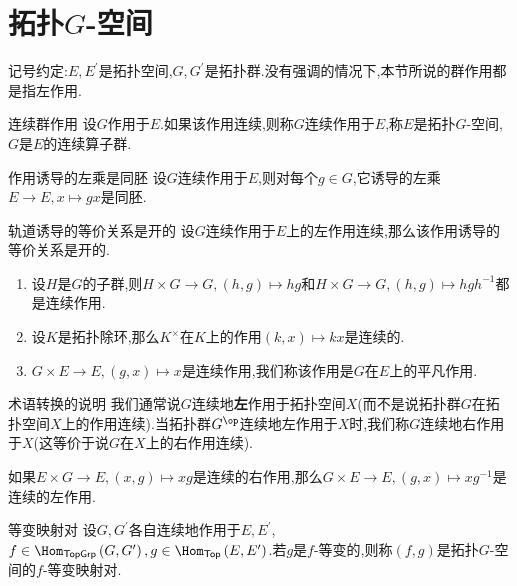 \section{拓扑\texorpdfstring{$G$}{G}-空间}

记号约定:$E,E^{\prime}$是拓扑空间,$G,G^{\prime}$是拓扑群.没有强调的情况下,本节所说的群作用都是指左作用.

\begin{definition}{连续群作用}{}
	设$G$作用于$E$.如果该作用连续,则称$G$连续作用于$E$,称$E$是拓扑$G$-空间,$G$是$E$的连续算子群.
\end{definition}

\begin{lemma}{作用诱导的左乘是同胚}{}
	设$G$连续作用于$E$,则对每个$g\in G$,它诱导的左乘$E\to E,x\mapsto gx$是同胚.
\end{lemma}

\begin{lemma}{轨道诱导的等价关系是开的}{}
	设$G$连续作用于$E$上的左作用连续,那么该作用诱导的等价关系是开的.
\end{lemma}

\begin{example}{}{}
	\begin{enumerate}
		\item 设$H$是$G$的子群,则$H\times G\to G,\left(h,g\right)\mapsto hg$和$H\times G\to G,\left(h,g\right)\mapsto hgh^{-1}$都是连续作用.
		\item 设$K$是拓扑除环,那么$K^{\times}$在$K$上的作用$\left(k,x\right)\mapsto kx$是连续的.
		\item $G\times E\to E,\left(g,x\right)\mapsto x$是连续作用,我们称该作用是$G$在$E$上的平凡作用.
	\end{enumerate}
\end{example}

\begin{remark}{术语转换的说明}{}
	我们通常说$G$连续地\textbf{左}作用于拓扑空间$X$(而不是说拓扑群$G$在拓扑空间$X$上的作用连续).当拓扑群$G^{\op}$连续地左作用于$X$时,我们称$G$连续地右作用于$X$(这等价于说$G$在$X$上的右作用连续).
	
	如果$E\times G\to E,\left(x,g\right)\mapsto xg$是连续的右作用,那么$G\times E\to E,\left(g,x\right)\mapsto xg^{-1}$是连续的左作用.
\end{remark}

\begin{definition}{等变映射对}{}
	设$G,G^{\prime}$各自连续地作用于$E,E^{\prime}$,$f\in\Hom_{\mathsf{TopGrp}}\left(G,G^{\prime}\right),g\in\Hom_{\mathsf{Top}}\left(E,E^{\prime}\right)$.若$g$是$f$-等变的,则称$\left(f,g\right)$是拓扑$G$-空间的$f$-等变映射对.
\end{definition}


